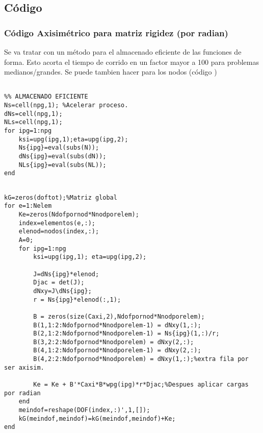 \clearpage
 \subsection*{Código \Matlab{}}
    \subsubsection*{Código Axisimétrico para matriz rigidez (por radian)}
    Se va tratar con un método para el almacenado eficiente de las funciones de forma. Esto acorta el tiempo de corrido en un factor mayor a 100 para problemas medianos/grandes. Se puede tambien hacer para los nodos (código )
    \begin{code}
    \begin{verbatim}

%% ALMACENADO EFICIENTE
Ns=cell(npg,1); %Acelerar proceso.
dNs=cell(npg,1);
NLs=cell(npg,1);
for ipg=1:npg
    ksi=upg(ipg,1);eta=upg(ipg,2);
    Ns{ipg}=eval(subs(N));
    dNs{ipg}=eval(subs(dN));
    NLs{ipg}=eval(subs(NL));
end
    \end{verbatim}
    \end{code}
    
    \begin{code}
    \begin{verbatim}
    
kG=zeros(doftot);%Matriz global
for e=1:Nelem
    Ke=zeros(Ndofpornod*Nnodporelem);
    index=elementos(e,:);
    elenod=nodos(index,:);
    A=0;
    for ipg=1:npg
        ksi=upg(ipg,1); eta=upg(ipg,2);

        J=dNs{ipg}*elenod;
        Djac = det(J);
        dNxy=J\dNs{ipg};
        r = Ns{ipg}*elenod(:,1); 
        
        B = zeros(size(Caxi,2),Ndofpornod*Nnodporelem);
        B(1,1:2:Ndofpornod*Nnodporelem-1) = dNxy(1,:);
        B(2,1:2:Ndofpornod*Nnodporelem-1) = Ns{ipg}(1,:)/r;
        B(3,2:2:Ndofpornod*Nnodporelem) = dNxy(2,:);
        B(4,1:2:Ndofpornod*Nnodporelem-1) = dNxy(2,:);
        B(4,2:2:Ndofpornod*Nnodporelem) = dNxy(1,:);%extra fila por ser axisim.

        Ke = Ke + B'*Caxi*B*wpg(ipg)*r*Djac;%Despues aplicar cargas por radian
    end
    meindof=reshape(DOF(index,:)',1,[]);
    kG(meindof,meindof)=kG(meindof,meindof)+Ke;
end
\end{verbatim}
\end{code}

